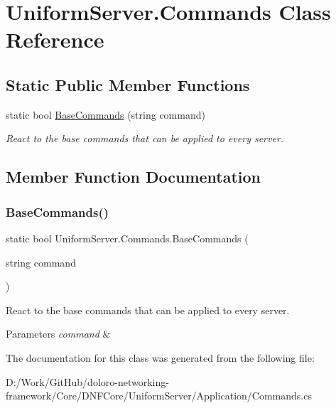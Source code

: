 \hypertarget{class_uniform_server_1_1_commands}{}\section{Uniform\+Server.\+Commands Class Reference}
\label{class_uniform_server_1_1_commands}
\subsection*{Static Public Member Functions}
\begin{DoxyCompactItemize}
\item 
static bool \mbox{\hyperlink{class_uniform_server_1_1_commands_ad1bac97da40d03e97f9b5fe7ed152ef9}{Base\+Commands}} (string command)
\begin{DoxyCompactList}\small\item\em React to the base commands that can be applied to every server. \end{DoxyCompactList}\end{DoxyCompactItemize}


\subsection{Member Function Documentation}
\mbox{\label{class_uniform_server_1_1_commands_ad1bac97da40d03e97f9b5fe7ed152ef9}} 
\subsubsection{\texorpdfstring{Base\+Commands()}{BaseCommands()}}
{\footnotesize\ttfamily static bool Uniform\+Server.\+Commands.\+Base\+Commands (\begin{DoxyParamCaption}\item[{string}]{command }\end{DoxyParamCaption})\hspace{0.3cm}{\ttfamily [static]}}



React to the base commands that can be applied to every server. 


\begin{DoxyParams}{Parameters}
{\em command} & \\
\hline
\end{DoxyParams}


The documentation for this class was generated from the following file\+:\begin{DoxyCompactItemize}
\item 
D\+:/\+Work/\+Git\+Hub/doloro-\/networking-\/framework/\+Core/\+D\+N\+F\+Core/\+Uniform\+Server/\+Application/Commands.\+cs\end{DoxyCompactItemize}
